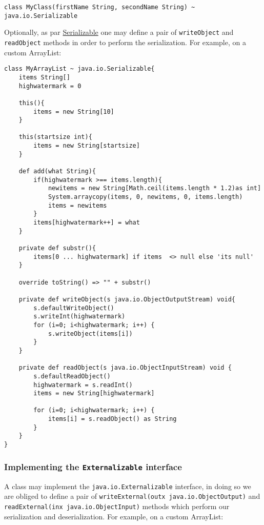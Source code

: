 \documentclass[conc-doc]{subfiles}
\begin{document}
\begin{lstlisting}
class MyClass(firstName String, secondName String) ~ java.io.Serializable
\end{lstlisting}

Optionally, as par \href{https://docs.oracle.com/javase/9/docs/api/java/io/Serializable.html}{Serializable} one may define a pair of \lstinline{writeObject} and \lstinline{readObject} methods in order to perform the serialization. For example, on a custom ArrayList:

\begin{lstlisting}
class MyArrayList ~ java.io.Serializable{
	items String[]
	highwatermark = 0
	
	this(){
		items = new String[10]
	}
	
	this(startsize int){
		items = new String[startsize]
	}
	
	def add(what String){
		if(highwatermark >== items.length){
			newitems = new String[Math.ceil(items.length * 1.2)as int]
			System.arraycopy(items, 0, newitems, 0, items.length)
			items = newitems
		}
		items[highwatermark++] = what
	}
	
	private def substr(){
		items[0 ... highwatermark] if items  <> null else 'its null'
	}
	
	override toString() => "" + substr()
	
	private def writeObject(s java.io.ObjectOutputStream) void{
		s.defaultWriteObject()
		s.writeInt(highwatermark)
		for (i=0; i<highwatermark; i++) {
			s.writeObject(items[i])
		}
	}
	
	private def readObject(s java.io.ObjectInputStream) void {
		s.defaultReadObject()
		highwatermark = s.readInt()
		items = new String[highwatermark] 
		
		for (i=0; i<highwatermark; i++) {
			items[i] = s.readObject() as String
		}
	}	
}
\end{lstlisting}

\subsubsection{Implementing the \lstinline{Externalizable} interface}
A class may implement the \lstinline{java.io.Externalizable} interface, in doing so we are obliged to define a pair of \lstinline{writeExternal(outx java.io.ObjectOutput)} and \lstinline{readExternal(inx java.io.ObjectInput)} methods which perform our serialization and deserialization. For example, on a custom ArrayList:
\end{document}
